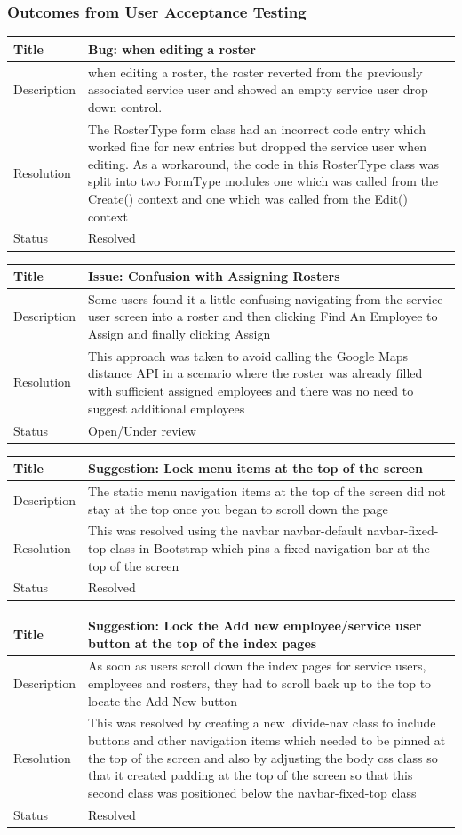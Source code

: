 \documentclass[a4paper,Times New Roman 11pt]{article}
\newcommand\addrow[2]{#1 &#2\\ }
\newcommand\addheading[2]{#1 &#2\\ \hline}
\newcommand\tabularhead{\begin{tabular}{lp{9cm}}
\hline
}
\newenvironment{usecase}{\tabularhead}
{\hline\end{tabular}}
\begin{document}
\subsubsection{Outcomes from User Acceptance Testing}

\begin{usecase}
    \addheading{Title}{Bug: when editing a roster}
  \addheading{Description}{when editing a roster, the roster reverted from the previously associated service user and showed an empty service user drop down control.}
  \addrow{Resolution}{The RosterType form class had an incorrect code entry which worked fine for new entries but dropped the service user when editing. As a workaround, the code in this RosterType class was split into two FormType modules one which was called from the Create() context and one which was called from the Edit() context}
  \addrow{Status}{Resolved}
\end{usecase}
\newline
\begin{usecase}
    \addheading{Title}{Issue: Confusion with Assigning Rosters}
  \addheading{Description}{Some users found it a little confusing navigating from the service user screen into a roster and then clicking Find An Employee to Assign and finally clicking Assign}
  \addrow{Resolution}{This approach was taken to avoid calling the Google Maps distance API in a scenario where the roster was already filled with sufficient assigned employees and there was no need to suggest additional employees}
  \addrow{Status}{Open/Under review}
\end{usecase} 
\newline
\begin{usecase}
    \addheading{Title}{Suggestion: Lock menu items at the top of the screen}
  \addheading{Description}{The static menu navigation items at the top of the screen did not stay at the top once you began to scroll down the page}
  \addrow{Resolution}{This was resolved using the navbar navbar-default navbar-fixed-top class in Bootstrap which pins a fixed navigation bar at the top of the screen}
  \addrow{Status}{Resolved}
\end{usecase} 
\newline
\begin{usecase}
    \addheading{Title}{Suggestion: Lock the Add new employee/service user button at the top of the index pages}
  \addheading{Description}{As soon as users scroll down the index pages for service users, employees and rosters, they had to scroll back up to the top to locate the Add New button}
  \addrow{Resolution}{This was resolved by creating a new .divide-nav class to include buttons and other navigation items which needed to be pinned at the top of the screen and also by adjusting the body css class so that it created padding at the top of the screen so that this second class was positioned below the navbar-fixed-top class}
  \addrow{Status}{Resolved}
\end{usecase} 
\newline
\end{document}
